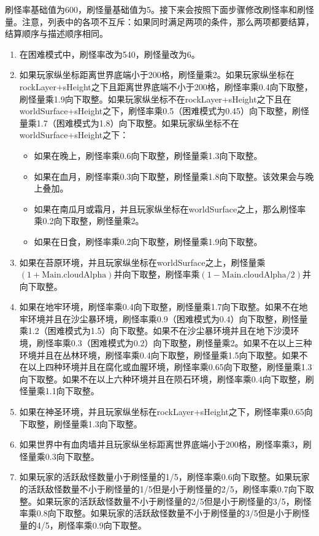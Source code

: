 刷怪率基础值为600，刷怪量基础值为5。接下来会按照下面步骤修改刷怪率和刷怪量。注意，列表中的各项不互斥：如果同时满足两项的条件，那么两项都要结算，结算顺序与描述顺序相同。
\begin{enumerate}
    \item 在困难模式中，刷怪率改为540，刷怪量改为6。
    \item 如果玩家纵坐标距离世界底端小于200格，刷怪量乘2。如果玩家纵坐标在rockLayer+sHeight之下且距离世界底端不小于200格，刷怪率乘0.4向下取整，刷怪量乘1.9向下取整。如果玩家纵坐标不在rockLayer+sHeight之下且在worldSurface+sHeight之下，刷怪率乘0.5（困难模式为0.45）向下取整，刷怪量乘1.7（困难模式为1.8）向下取整。如果玩家纵坐标不在worldSurface+sHeight之下：\begin{itemize}
        \item 如果在晚上，刷怪率乘0.6向下取整，刷怪量乘1.3向下取整。
        \item 如果在血月，刷怪率乘0.3向下取整，刷怪量乘1.8向下取整。该效果会与晚上叠加。
        \item 如果在南瓜月或霜月，并且玩家纵坐标在worldSurface之上，那么刷怪率乘0.2向下取整，刷怪量乘2。
        \item 如果在日食，刷怪率乘0.2向下取整，刷怪量乘1.9向下取整。
    \end{itemize}
    \item 如果在苔原环境，并且玩家纵坐标在worldSurface之上，刷怪量乘$(1+\textrm{Main.cloudAlpha})$并向下取整，刷怪率乘$(1-\textrm{Main.cloudAlpha}/2)$并向下取整。
    \item 如果在地牢环境，刷怪率乘0.4向下取整，刷怪量乘1.7向下取整。如果不在地牢环境并且在沙尘暴环境，刷怪率乘0.9（困难模式为0.4）向下取整，刷怪量乘1.2（困难模式为1.5）向下取整。如果不在沙尘暴环境并且在地下沙漠环境，刷怪率乘0.3（困难模式为0.2）向下取整，刷怪量乘2。如果不在以上三种环境并且在丛林环境，刷怪率乘0.4向下取整，刷怪量乘1.5向下取整。如果不在以上四种环境并且在腐化或血腥环境，刷怪率乘0.65向下取整，刷怪量乘1.3向下取整。如果不在以上六种环境并且在陨石环境，刷怪率乘0.4向下取整，刷怪量乘1.1向下取整。
    \item 如果在神圣环境，并且玩家纵坐标在rockLayer+sHeight之下，刷怪率乘0.65向下取整，刷怪量乘1.3向下取整。
    \item 如果世界中有血肉墙并且玩家纵坐标距离世界底端小于200格，刷怪率乘3，刷怪量乘0.3向下取整。
    \item 如果玩家的活跃敌怪数量小于刷怪量的1/5，刷怪率乘0.6向下取整。如果玩家的活跃敌怪数量不小于刷怪量的1/5但是小于刷怪量的2/5，刷怪率乘0.7向下取整。如果玩家的活跃敌怪数量不小于刷怪量的2/5但是小于刷怪量的3/5，刷怪率乘0.8向下取整。如果玩家的活跃敌怪数量不小于刷怪量的3/5但是小于刷怪量的4/5，刷怪率乘0.9向下取整。

\end{enumerate}
